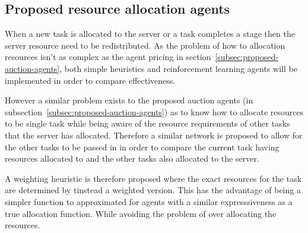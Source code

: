 
\subsection{Proposed resource allocation agents}\label{subsec:proposed-resource-allocation-agents}
When a new task is allocated to the server or a task completes a stage then the server resource need to be
redistributed. As the problem of how to allocation resources isn't as complex as the agent pricing in
section~\ref{subsec:proposed-auction-agents}, both simple heuristics and reinforcement learning agents will be
implemented in order to compare effectiveness.

However a similar problem exists to the proposed auction agents (in subsection~\ref{subsec:proposed-auction-agents}) as
to know how to allocate resources to be single task while being aware of the resource requirements of other tasks that
the server has allocated. Therefore a similar network is proposed to allow for the other tasks to be passed in in order
to compare the current task having resources allocated to and the other tasks also allocated to the server.

A weighting heuristic is therefore proposed where the exact resources for the task are determined by tinstead a weighted version.
This has the advantage of being a simpler function to approximated for agents with a similar expresssiveness as a
true allocation function. While avoiding the problem of over allocating the resources.
